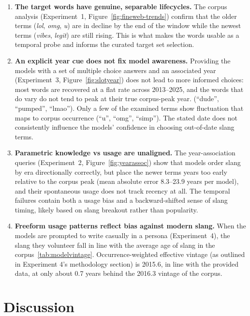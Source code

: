 \documentclass[11pt]{article}
\begin{document}
\begin{enumerate}
  \item \textbf{The target words have genuine, separable lifecycles.} The corpus analysis (Experiment~1, Figure~\ref{fig:fineweb-trends}) confirm that the older terms (\textit{lol}, \textit{omg}, \textit{u}) are in decline by the end of the window while the newest terms (\textit{vibes}, \textit{legit}) are still rising. This is what makes the words usable as a temporal probe and informs the curated target set selection.

  \item \textbf{An explicit year cue does not fix model awareness.} Providing the models with a set of multiple choice answers and an associated year (Experiment~3, Figure~\ref{fig:slotyear}) does not lead to more informed choices: most words are recovered at a flat rate across 2013--2025, and the words that do vary do not tend to peak at their true corpus-peak year. (``dude'', ``pumped'', ``lmao''). Only a few of the examined terms show fluctuation that maps to corpus occurrence (``u'', ``omg'', ``simp''). The stated date does not consistently influence the models' confidence in choosing out-of-date slang terms. %

  \item \textbf{Parametric knowledge vs usage are unaligned.} The year-association queries (Experiment~2, Figure~\ref{fig:yearassoc}) show that models order slang by era directionally correctly, but place the newer terms years too early relative to the corpus peak (mean absolute error 8.3--23.9 years per model), and their spontaneous usage does not track recency at all. The temporal failures contain both a usage bias and a backward-shifted sense of slang timing, likely based on slang breakout rather than popularity.

  \item \textbf{Freeform usage patterns reflect bias against modern slang.} When the models are prompted to write casually in a persona (Experiment~4), the slang they volunteer fall in line with the average age of slang in the corpus~\ref{tab:modelvintage}. Occurrence-weighted effective vintage (as outlined in Experiment 4's methodology section) is 2015.6, in line with the provided data, at only about 0.7 years behind the 2016.3 vintage of the corpus.
\end{enumerate}

\section{Discussion}
\end{document}
